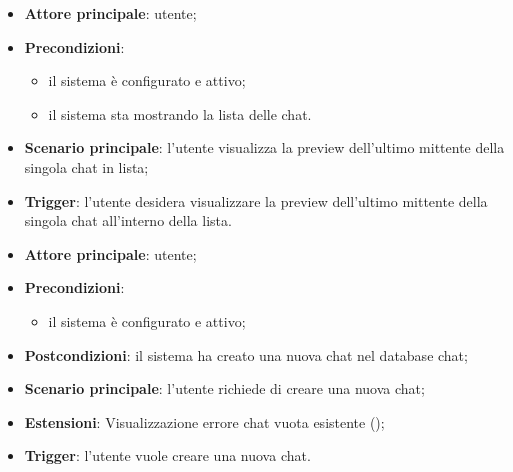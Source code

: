 \documentclass[10pt, a4paper]{article}
\begin{document}
    \begin{itemize}
        \item \textbf{Attore principale}: utente;
        \item \textbf{Precondizioni}:
            \begin{itemize}
                \item il sistema è configurato e attivo;
                \item il sistema sta mostrando la lista delle chat.
            \end{itemize}
        \item \textbf{Scenario principale}: l'utente visualizza la preview dell'ultimo mittente della singola chat in lista;
        \item \textbf{Trigger}: l’utente desidera visualizzare la preview dell'ultimo mittente della singola chat all’interno della lista.
    \end{itemize}


    \begin{itemize}
        \item \textbf{Attore principale}: utente;
        \item \textbf{Precondizioni}:
        \begin{itemize}
            \item il sistema è configurato e attivo;
        \end{itemize}
        \item \textbf{Postcondizioni}: il sistema ha creato una nuova chat nel database chat;
        \item \textbf{Scenario principale}: l’utente richiede di creare una nuova chat;
        \item \textbf{Estensioni}: Visualizzazione errore chat vuota esistente ();
        \item \textbf{Trigger}: l’utente vuole creare una nuova chat.
    \end{itemize}
\end{document}
